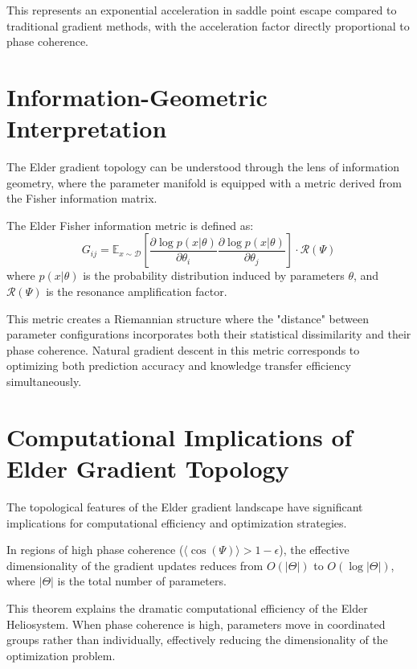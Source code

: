 This represents an exponential acceleration in saddle point escape compared to traditional gradient methods, with the acceleration factor directly proportional to phase coherence.

\section{Information-Geometric Interpretation}

The Elder gradient topology can be understood through the lens of information geometry, where the parameter manifold is equipped with a metric derived from the Fisher information matrix.

\begin{definition}
The Elder Fisher information metric is defined as:
\begin{equation}
G_{ij} = \mathbb{E}_{x \sim \mathcal{D}} \left[ \frac{\partial \log p(x|\theta)}{\partial \theta_i} \frac{\partial \log p(x|\theta)}{\partial \theta_j} \right] \cdot \mathcal{R}(\Psi)
\end{equation}
where $p(x|\theta)$ is the probability distribution induced by parameters $\theta$, and $\mathcal{R}(\Psi)$ is the resonance amplification factor.
\end{definition}

This metric creates a Riemannian structure where the "distance" between parameter configurations incorporates both their statistical dissimilarity and their phase coherence. Natural gradient descent in this metric corresponds to optimizing both prediction accuracy and knowledge transfer efficiency simultaneously.

\section{Computational Implications of Elder Gradient Topology}

The topological features of the Elder gradient landscape have significant implications for computational efficiency and optimization strategies.

\begin{theorem}
In regions of high phase coherence ($\langle\cos(\Psi)\rangle > 1-\epsilon$), the effective dimensionality of the gradient updates reduces from $O(|\Theta|)$ to $O(\log|\Theta|)$, where $|\Theta|$ is the total number of parameters.
\end{theorem}

This theorem explains the dramatic computational efficiency of the Elder Heliosystem. When phase coherence is high, parameters move in coordinated groups rather than individually, effectively reducing the dimensionality of the optimization problem.

